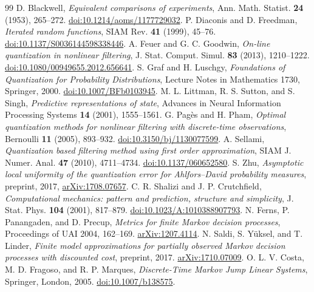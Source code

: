 \begin{thebibliography}{99}
 D. Blackwell, \emph{Equivalent comparisons of experiments}, Ann. Math. Statist. \textbf{24} (1953), 265--272. \href{https://doi.org/10.1214/aoms/1177729032}{doi:10.1214/aoms/1177729032}.
 P. Diaconis and D. Freedman, \emph{Iterated random functions}, SIAM Rev. \textbf{41} (1999), 45--76. \href{https://doi.org/10.1137/S0036144598338446}{doi:10.1137/S0036144598338446}.
 A. Feuer and G. C. Goodwin, \emph{On-line quantization in nonlinear filtering}, J. Stat. Comput. Simul. \textbf{83} (2013), 1210--1222. \href{https://doi.org/10.1080/00949655.2012.656641}{doi:10.1080/00949655.2012.656641}.
 S. Graf and H. Luschgy, \emph{Foundations of Quantization for Probability Distributions}, Lecture Notes in Mathematics 1730, Springer, 2000. \href{https://doi.org/10.1007/BFb0103945}{doi:10.1007/BFb0103945}.
 M. L. Littman, R. S. Sutton, and S. Singh, \emph{Predictive representations of state}, Advances in Neural Information Processing Systems \textbf{14} (2001), 1555--1561.
 G. Pag\`es and H. Pham, \emph{Optimal quantization methods for nonlinear filtering with discrete-time observations}, Bernoulli \textbf{11} (2005), 893--932. \href{https://doi.org/10.3150/bj/1130077599}{doi:10.3150/bj/1130077599}.
 A. Sellami, \emph{Quantization based filtering method using first order approximation}, SIAM J. Numer. Anal. \textbf{47} (2010), 4711--4734. \href{https://doi.org/10.1137/060652580}{doi:10.1137/060652580}.
 S. Zhu, \emph{Asymptotic local uniformity of the quantization error for Ahlfors--David probability measures}, preprint, 2017, \href{https://arxiv.org/abs/1708.07657}{arXiv:1708.07657}.
 C. R. Shalizi and J. P. Crutchfield, \emph{Computational mechanics: pattern and prediction, structure and simplicity}, J. Stat. Phys. \textbf{104} (2001), 817--879. \href{https://doi.org/10.1023/A:1010388907793}{doi:10.1023/A:1010388907793}.
 N. Ferns, P. Panangaden, and D. Precup, \emph{Metrics for finite Markov decision processes}, Proceedings of UAI 2004, 162--169. \href{https://arxiv.org/abs/1207.4114}{arXiv:1207.4114}.
 N. Saldi, S. Y\"uksel, and T. Linder, \emph{Finite model approximations for partially observed Markov decision processes with discounted cost}, preprint, 2017. \href{https://arxiv.org/abs/1710.07009}{arXiv:1710.07009}.
 O. L. V. Costa, M. D. Fragoso, and R. P. Marques, \emph{Discrete-Time Markov Jump Linear Systems}, Springer, London, 2005. \href{https://doi.org/10.1007/b138575}{doi:10.1007/b138575}.

\end{thebibliography}
